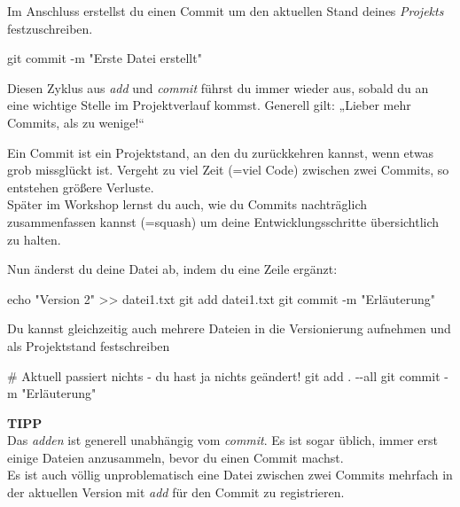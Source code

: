 \documentclass[
  letterpaper,
  DIV=11]{scrreprt}
\newenvironment{Shaded}{\begin{snugshade}}{\end{snugshade}}
\newcommand{\AttributeTok}[1]{\textcolor[rgb]{0.40,0.45,0.13}{#1}}
\newcommand{\BuiltInTok}[1]{\textcolor[rgb]{0.00,0.23,0.31}{#1}}
\newcommand{\CommentTok}[1]{\textcolor[rgb]{0.37,0.37,0.37}{#1}}
\newcommand{\FunctionTok}[1]{\textcolor[rgb]{0.28,0.35,0.67}{#1}}
\newcommand{\NormalTok}[1]{\textcolor[rgb]{0.00,0.23,0.31}{#1}}
\newcommand{\OperatorTok}[1]{\textcolor[rgb]{0.37,0.37,0.37}{#1}}
\newcommand{\StringTok}[1]{\textcolor[rgb]{0.13,0.47,0.30}{#1}}
\begin{document}
Im Anschluss erstellst du einen Commit um den aktuellen Stand deines
\emph{Projekts} festzuschreiben.

\begin{Shaded}
\begin{Highlighting}[]
\FunctionTok{git}\NormalTok{ commit }\AttributeTok{{-}m} \StringTok{"Erste Datei erstellt"}
\end{Highlighting}
\end{Shaded}

Diesen Zyklus aus \emph{add} und \emph{commit} führst du immer wieder
aus, sobald du an eine wichtige Stelle im Projektverlauf kommst.
Generell gilt: „Lieber mehr Commits, als zu wenige!{}``

Ein Commit ist ein Projektstand, an den du zurückkehren kannst, wenn
etwas grob missglückt ist. Vergeht zu viel Zeit (=viel Code) zwischen
zwei Commits, so entstehen größere Verluste.\\
Später im Workshop lernst du auch, wie du Commits nachträglich
zusammenfassen kannst (=squash) um deine Entwicklungsschritte
übersichtlich zu halten.

Nun änderst du deine Datei ab, indem du eine Zeile ergänzt:

\begin{Shaded}
\begin{Highlighting}[]
\BuiltInTok{echo} \StringTok{"Version 2"} \OperatorTok{\textgreater{}\textgreater{}}\NormalTok{ datei1.txt }
\FunctionTok{git}\NormalTok{ add datei1.txt }
\FunctionTok{git}\NormalTok{ commit }\AttributeTok{{-}m} \StringTok{"Erläuterung"}
\end{Highlighting}
\end{Shaded}

Du kannst gleichzeitig auch mehrere Dateien in die Versionierung
aufnehmen und als Projektstand festschreiben

\begin{Shaded}
\begin{Highlighting}[]
\CommentTok{\# Aktuell passiert nichts {-} du hast ja nichts geändert!}
\FunctionTok{git}\NormalTok{ add . }\AttributeTok{{-}{-}all} 
\FunctionTok{git}\NormalTok{ commit }\AttributeTok{{-}m} \StringTok{"Erläuterung"}
\end{Highlighting}
\end{Shaded}

\samplestart

\textbf{TIPP}\\
Das \emph{adden} ist generell unabhängig vom \emph{commit}. Es ist sogar
üblich, immer erst einige Dateien anzusammeln, bevor du einen Commit
machst.\\
Es ist auch völlig unproblematisch eine Datei zwischen zwei Commits
mehrfach in der aktuellen Version mit \emph{add} für den Commit zu
registrieren.
\end{document}
